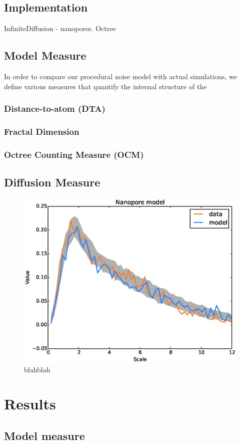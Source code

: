 \documentclass[aps,pre,twocolumn,letterpaper,floatfix,showpacs]{revtex4}
\begin{document}
\subsection{Implementation}
InfiniteDiffusion - nanopores. 
Octree

\subsection{Model Measure}
In order to compare our procedural noise model with actual simulations, we define various measures that quantify the internal structure of the 
\subsubsection{Distance-to-atom (DTA)}
\subsubsection{Fractal Dimension}
\subsubsection{Octree Counting Measure (OCM)}

\subsection{Diffusion Measure}


\begin{figure}
\includegraphics[width=.5\textwidth]{model1.eps}
\caption{blahblah}
\label{fig:model12}
\end{figure}



\section{Results}

\subsection{Model measure}
\end{document}
